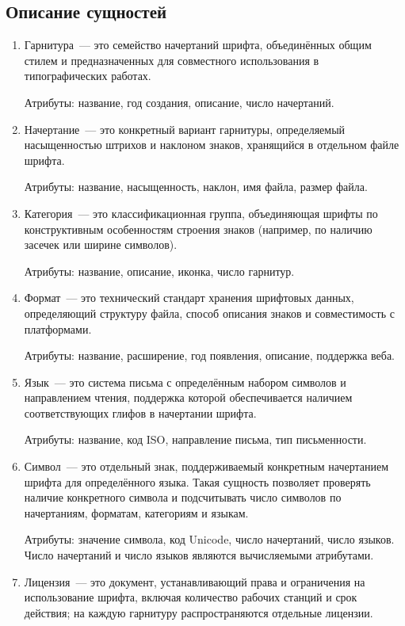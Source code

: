 \subsection{Описание сущностей}

\begin{enumerate}
    \item Гарнитура~--- это семейство начертаний шрифта, объединённых общим стилем и предназначенных для совместного использования в типографических работах.

    Атрибуты: название, год создания, описание, число начертаний.

    \item Начертание~--- это конкретный вариант гарнитуры, определяемый насыщенностью штрихов и наклоном знаков, хранящийся в отдельном файле шрифта.

    Атрибуты: название, насыщенность, наклон, имя файла, размер файла.

    \item Категория~--- это классификационная группа, объединяющая шрифты по конструктивным особенностям строения знаков (например, по наличию засечек или ширине символов).

    Атрибуты: название, описание, иконка, число гарнитур.

    \item Формат~--- это технический стандарт хранения шрифтовых данных, определяющий структуру файла, способ описания знаков и совместимость с платформами.

    Атрибуты: название, расширение, год появления, описание, поддержка веба.

    \item Язык~--- это система письма с определённым набором символов и направлением чтения, поддержка которой обеспечивается наличием соответствующих глифов в начертании шрифта.

    Атрибуты: название, код ISO, направление письма, тип письменности.

    \item Символ~--- это отдельный знак, поддерживаемый конкретным начертанием шрифта для определённого языка. Такая сущность позволяет проверять наличие конкретного символа и подсчитывать число символов по начертаниям, форматам, категориям и языкам.

    Атрибуты: значение символа, код Unicode, число начертаний, число языков. Число начертаний и число языков являются вычисляемыми атрибутами.

    \item Лицензия~--- это документ, устанавливающий права и ограничения на использование шрифта, включая количество рабочих станций и срок действия; на каждую гарнитуру распространяются отдельные лицензии.


\end{enumerate}
